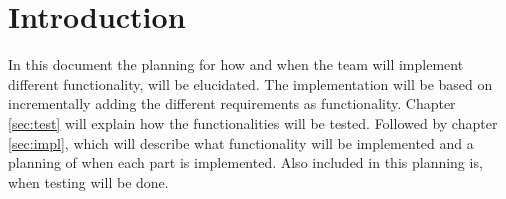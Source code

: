 \chapter{Introduction}
In this document the planning for how and when the team will implement different functionality, will be elucidated. The implementation will be based on incrementally adding the different requirements as functionality. Chapter \ref{sec:test} will explain how the functionalities will be tested. Followed by chapter \ref{sec:impl}, which will describe what functionality will be implemented and a planning of when each part is implemented. Also included in this planning is, when testing will be done. 